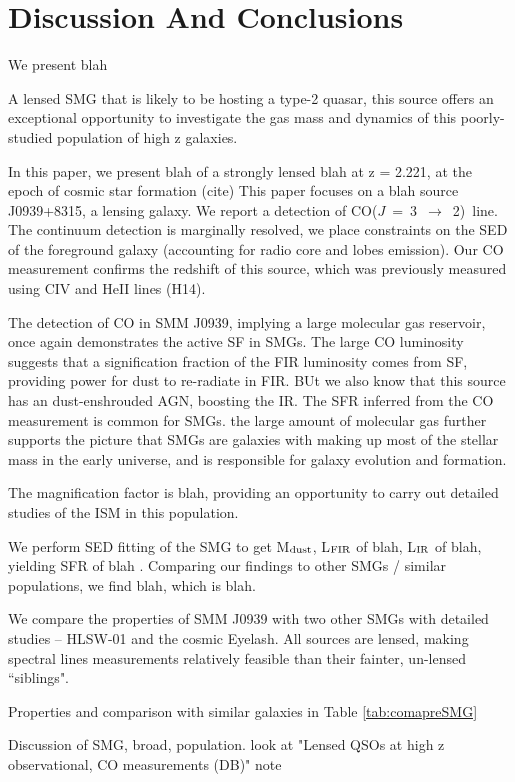 \documentclass[twocolumn,apj,numberedappendix]{emulateapj}
\newcommand{\CO}{\mbox{CO($J$ = 3 $\rightarrow$ 2) }}
\begin{document}
\section{Discussion And Conclusions} \label{sec:conclusions}
We present blah

A lensed SMG that is likely to be hosting a type-2 quasar, this source offers an exceptional opportunity to
investigate the gas mass and dynamics of this
poorly-studied population of high z galaxies.

In this paper, we present blah of a strongly lensed blah at z = 2.221, at the epoch of cosmic star formation (cite)
This paper focuses on a blah source J0939+8315, a lensing galaxy.
We report a detection of \CO line.
The continuum detection is marginally resolved, we place constraints on the SED of the foreground galaxy (accounting for radio 
core and lobes emission). Our CO measurement confirms the redshift of this source, which was previously measured using CIV and HeII lines (H14).

The detection of CO in SMM J0939, implying a large molecular gas reservoir, once again demonstrates the active SF in SMGs. 
The large CO luminosity suggests that a signification fraction of the FIR luminosity comes from SF, providing power for dust to re-radiate in FIR. BUt we also know that this source has an dust-enshrouded AGN, boosting the IR.
The SFR inferred from the CO measurement is common for SMGs. the large amount of molecular gas further supports the picture that SMGs are galaxies with making up most of the stellar mass in the early universe, and is responsible for galaxy evolution and formation. 

The magnification factor is blah, providing an opportunity to carry out detailed studies of the ISM in this population.

We perform SED fitting of the SMG to get M$_{\rm dust}$, L$_{\rm FIR}$ of blah, L$_{\rm IR}$ of blah, yielding SFR of 
blah . Comparing our findings to other SMGs / similar populations, we find blah, which is blah.

We compare the properties of SMM J0939 with two other SMGs with detailed studies -- HLSW-01 and the cosmic Eyelash. All sources are lensed, making spectral lines measurements relatively feasible than their fainter, un-lensed ``siblings". 

Properties and comparison with similar galaxies in Table \ref{tab:comapreSMG}

Discussion of SMG, broad, population.
look at "Lensed QSOs at high z observational, CO measurements (DB)" note
\end{document}

